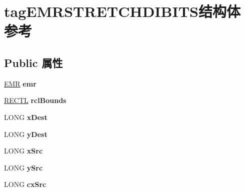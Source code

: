 \hypertarget{structtag_e_m_r_s_t_r_e_t_c_h_d_i_b_i_t_s}{}\section{tag\+E\+M\+R\+S\+T\+R\+E\+T\+C\+H\+D\+I\+B\+I\+T\+S结构体 参考}
\label{structtag_e_m_r_s_t_r_e_t_c_h_d_i_b_i_t_s}
\subsection*{Public 属性}
\begin{DoxyCompactItemize}
\item 
\mbox{\label{structtag_e_m_r_s_t_r_e_t_c_h_d_i_b_i_t_s_a0e9211ed00863ffdf6eab7cceb439770}} 
\hyperlink{structtag_e_m_r}{E\+MR} {\bfseries emr}
\item 
\mbox{\label{structtag_e_m_r_s_t_r_e_t_c_h_d_i_b_i_t_s_a182835a582a04963666fbc5329f55f45}} 
\hyperlink{struct___r_e_c_t_l}{R\+E\+C\+TL} {\bfseries rcl\+Bounds}
\item 
\mbox{\label{structtag_e_m_r_s_t_r_e_t_c_h_d_i_b_i_t_s_a1cbac13a02e2c20a60792e7cdb56dbb2}} 
L\+O\+NG {\bfseries x\+Dest}
\item 
\mbox{\label{structtag_e_m_r_s_t_r_e_t_c_h_d_i_b_i_t_s_aaf68524f7a931bd57f613f65f8b1ccf8}} 
L\+O\+NG {\bfseries y\+Dest}
\item 
\mbox{\label{structtag_e_m_r_s_t_r_e_t_c_h_d_i_b_i_t_s_ab07cfbb7e6015c7b63a3f0f93fcc92f8}} 
L\+O\+NG {\bfseries x\+Src}
\item 
\mbox{\label{structtag_e_m_r_s_t_r_e_t_c_h_d_i_b_i_t_s_a347cadc62021d1282ced3c1f15085edc}} 
L\+O\+NG {\bfseries y\+Src}
\item 
\mbox{\label{structtag_e_m_r_s_t_r_e_t_c_h_d_i_b_i_t_s_a0ae3c89ea5433275e9ef3d4adbc82d18}} 
L\+O\+NG {\bfseries cx\+Src}
\item 

\end{DoxyCompactItemize}
